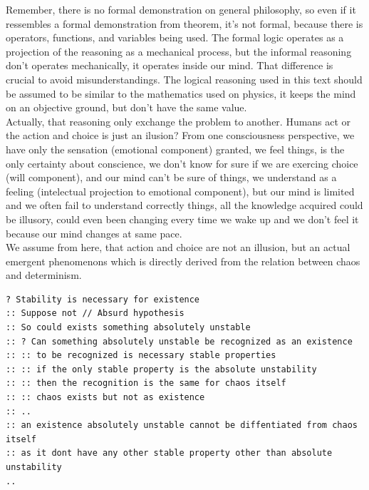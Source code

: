 \documentclass[12pt,a4paper]{article}
\begin{document}
\hspace{\baselineskip}

Remember, there is no formal demonstration on general philosophy, so even if it ressembles a formal demonstration from theorem, it's not formal, because there is operators, functions, and variables being used. The formal logic operates as a projection of the reasoning as a mechanical process, but the informal reasoning don't operates mechanically, it operates inside our mind. That difference is crucial to avoid misunderstandings. The logical reasoning used in this text should be assumed to be similar to the mathematics used on physics, it keeps the mind on an objective ground, but don't have the same value.\\

Actually, that reasoning only exchange the problem to another. Humans act or the action and choice is just an ilusion? From one consciousness perspective, we have only the sensation (emotional component) granted, we feel things, is the only certainty about conscience, we don't know for sure if we are exercing choice (will component), and our mind can't be sure of things, we understand as a feeling (intelectual projection to emotional component), but our mind is limited and we often fail to understand correctly things, all the knowledge acquired could be illusory, could even been changing every time we wake up and we don't feel it because our mind changes at same pace.\\

We assume from here, that action and choice are not an illusion, but an actual emergent phenomenons which is directly derived from the relation between chaos and determinism.\\

\begin{lstlisting}
? Stability is necessary for existence 
:: Suppose not // Absurd hypothesis 
:: So could exists something absolutely unstable
:: ? Can something absolutely unstable be recognized as an existence 
:: :: to be recognized is necessary stable properties 
:: :: if the only stable property is the absolute unstability 
:: :: then the recognition is the same for chaos itself 
:: :: chaos exists but not as existence
:: ..
:: an existence absolutely unstable cannot be diffentiated from chaos itself 
:: as it dont have any other stable property other than absolute unstability 
..
\end{lstlisting}

\hspace{\baselineskip}
\end{document}
